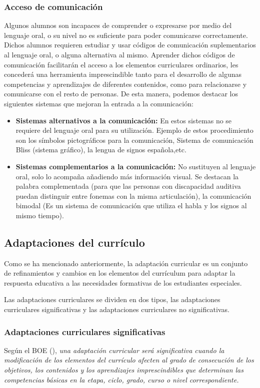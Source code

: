 \subsubsection{Acceso de comunicación}
Algunos alumnos son incapaces de comprender o expresarse por medio del lenguaje oral, o su nivel no es suficiente para poder comunicarse correctamente. Dichos alumnos requieren estudiar y usar códigos de comunicación suplementarios al lenguaje oral, o alguna alternativa al mismo. Aprender dichos códigos de comunicación facilitarán el acceso a los elementos curriculares ordinarios, les concederá una herramienta imprescindible tanto para el desarrollo de algunas competencias y aprendizajes de diferentes contenidos, como para relacionarse y comunicarse con el resto de personas. De esta manera, podemos destacar los siguientes sistemas que mejoran la  entrada a la comunicación:
\begin{itemize}
    \item \textbf{Sistemas alternativos a la comunicación:} En estos sistemas no se requiere del lenguaje oral para su utilización. Ejemplo de estos procedimiento son los símbolos pictográficos para la comunicación, Sistema de comunicación Bliss (sistema gráfico), la lengua de signos española,etc.
    
    \item \textbf{Sistemas complementarios a la comunicación:} No sustituyen al lenguaje oral, solo lo acompaña añadiendo más información visual. Se destacan la palabra complementada (para que las personas con discapacidad auditiva puedan distinguir entre fonemas con la misma articulación), la comunicación bimodal (Es un sistema de comunicación que utiliza el habla y los signos al mismo tiempo).
\end{itemize}

\subsection{Adaptaciones del currículo}

Como se ha mencionado anteriormente, la adaptación curricular es un conjunto de refinamientos y cambios en los elementos del currículum para adaptar la respuesta educativa a las necesidades formativas de los estudiantes especiales.

Las adaptaciones curriculares se dividen en dos tipos, las adaptaciones curriculares significativas y las adaptaciones curriculares no significativas.
\subsubsection{Adaptaciones curriculares significativas}
Según el BOE (\citeyear{BOE}), \textit{una adaptación curricular será significativa cuando la modificación de los elementos del currículo afecten al grado de consecución de los objetivos, los contenidos y los aprendizajes imprescindibles que determinan las competencias básicas en la etapa, ciclo, grado, curso o nivel correspondiente. }

